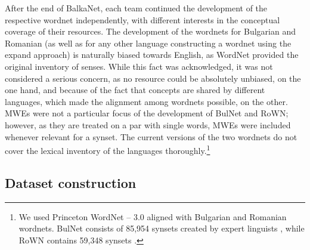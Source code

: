 \documentclass[output=paper,colorlinks,citecolor=brown]{langscibook}
\begin{document}
After the end of BalkaNet, each team continued the development of the respective wordnet independently, with different interests in the conceptual coverage of their resources. The development of the wordnets for Bulgarian and Romanian (as well as for any other language constructing a wordnet using the expand approach) is naturally biased towards English, as WordNet provided the original inventory of senses. While this fact was acknowledged, it was not considered a serious concern, as no resource could be absolutely unbiased, on the one hand, and because of the fact that concepts are shared by different languages, which made the alignment among wordnets possible, on the other. MWEs were not a particular focus of the development of BulNet and RoWN; however, as they are treated on a par with single words, MWEs were included whenever relevant for a synset. 
The current versions of the two wordnets do not cover the lexical inventory of the languages thoroughly.\footnote{We used Princeton WordNet -- 3.0 aligned with Bulgarian and Romanian wordnets. BulNet consists of %
85,954 synsets created %
by expert linguists \citep{Koeva2021}%
, while RoWN contains 59,348 synsets \citep{rown}.}  




\subsection{Dataset construction} \label{sec:dataset}\largerpage
\end{document}
